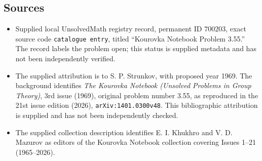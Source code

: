 \documentclass[11pt]{article}
\begin{document}
\subsection{Sources}
\begin{itemize}
\item Supplied local UnsolvedMath registry record, permanent ID \(700203\), exact source code \texttt{catalogue entry}, titled ``Kourovka Notebook Problem 3.55.'' The record labels the problem open; this status is supplied metadata and has not been independently verified.
\item The supplied attribution is to S. P. Strunkov, with proposed year 1969. The background identifies \emph{The Kourovka Notebook (Unsolved Problems in Group Theory)}, 3rd issue (1969), original problem number 3.55, as reproduced in the 21st issue edition (2026), \texttt{arXiv:1401.0300v48}. This bibliographic attribution is supplied and has not been independently checked.
\item The supplied collection description identifies E. I. Khukhro and V. D. Mazurov as editors of the Kourovka Notebook collection covering Issues 1--21 (1965--2026).
\end{itemize}
\end{document}
